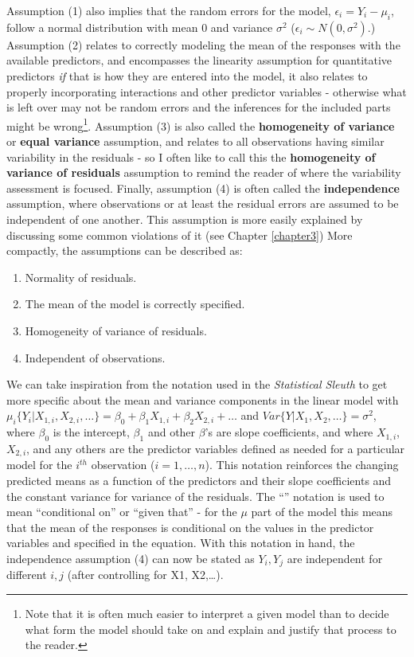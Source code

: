 \documentclass[
]{book}
\begin{document}
Assumption (1) also implies that the random errors for the model, \(\epsilon_i = Y_i - \mu_i\), follow a normal distribution with mean 0 and variance \(\sigma^2\) (\(\epsilon_i \sim N(0, \sigma^2)\).) Assumption (2) relates to correctly modeling the mean of the responses with the available predictors, and encompasses the linearity assumption for quantitative predictors \emph{if} that is how they are entered into the model, it also relates to properly incorporating interactions and other predictor variables - otherwise what is left over may not be random errors and the inferences for the included parts might be wrong\footnote{Note that it is often much easier to interpret a given model than to decide what form the model should take on and explain and justify that process to the reader.}. Assumption (3) is also called the \textbf{homogeneity of variance} or \textbf{equal variance} assumption, and relates to all observations having similar variability in the residuals - so I often like to call this the \textbf{homogeneity of variance of residuals} assumption to remind the reader of where the variability assessment is focused. Finally, assumption (4) is often called the \textbf{independence} assumption, where observations or at least the residual errors are assumed to be independent of one another. This assumption is more easily explained by discussing some common violations of it (see Chapter \ref{chapter3}) More compactly, the assumptions can be described as:

\begin{enumerate}
\def\labelenumi{\arabic{enumi})}
\item
  Normality of residuals.
\item
  The mean of the model is correctly specified.
\item
  Homogeneity of variance of residuals.
\item
  Independent of observations.
\end{enumerate}

\indent We can take inspiration from the notation used in the \emph{Statistical Sleuth} to get more specific about the mean and variance components in the linear model with \(\mu_i\{Y_i|X_{1,i}, X_{2,i}, \ldots \} = \beta_0 + \beta_1X_{1,i} + \beta_2X_{2,i} + \ldots\) and \(Var\{Y|X_1, X_2, \ldots \} = \sigma^2\), where \(\beta_0\) is the intercept, \(\beta_1\) and other \(\beta\)'s are slope coefficients, and where \(X_{1,i}\), \(X_{2,i}\), and any others are the predictor variables defined as needed for a particular model for the \(i^{th}\) observation (\(i = 1, \ldots, n\)). This notation reinforces the changing predicted means as a function of the predictors and their slope coefficients and the constant variance for variance of the residuals. The ``\textbar{}'' notation is used to mean ``conditional on'' or ``given that'' - for the \(\mu\) part of the model this means that the mean of the responses is conditional on the values in the predictor variables and specified in the equation. With this notation in hand, the independence assumption (4) can now be stated as \(Y_i,Y_{j}\) are independent for different \(i,j\) (after controlling for X1, X2,\ldots).
\end{document}
